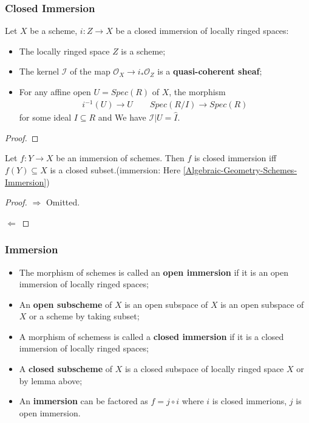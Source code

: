 \documentclass[Total.tex]{subfiles}
\begin{document}
		\subsubsection{Closed Immersion}
		\begin{lemma}
			Let $X$ be a scheme, $i:Z\rightarrow X$ be a closed immersion of locally ringed spaces:
			\begin{itemize}
				\item The locally ringed space $Z$ is a scheme;
				\item The kernel $\mathcal{I}$ of the map $\mathcal{O}_X\rightarrow i_*\mathcal{O}_Z$ is a \textbf{quasi-coherent sheaf};
				\item For any affine open $U=Spec(R)$ of $X$, the morphism
				\begin{gather*}
					i^{-1}(U)\rightarrow U\qquad Spec(R/I)\rightarrow Spec(R)
				\end{gather*}
				for some ideal $I\subseteq R$ and
				We have $\mathcal{I}|U=\hat{I}$.
			\end{itemize}
		\end{lemma}
		\begin{proof}
			
		\end{proof}
		
		\begin{lemma}
			Let $f:Y\rightarrow X$ be an immersion of schemes. Then $f$ is closed immersion iff $f(Y)\subseteq X$ is a closed subset.(immersion: Here \ref{Algebraic-Geometry-Schemes-Immersion})
		\end{lemma}
		\begin{proof}
			$\Rightarrow$ Omitted.
			
			$\Leftarrow$ 
		\end{proof}
		\subsubsection{Immersion}
		\begin{Def}
			\begin{itemize}
				\item The morphism of schemes is called an \textbf{open immersion} if it is an open immersion of locally ringed spaces;
				\item An \textbf{open subscheme} of $X$ is an open subspace of $X$ is an open subspace of $X$ or a scheme by taking subset;
				\item A morphism of schemess is called a \textbf{closed immersion} if it is a closed immersion of locally ringed spaces;
				\item A \textbf{closed subscheme} of $X$ is a closed subspace of locally ringed space $X$ or by lemma above;
				\item An \textbf{immersion} can be factored as $f=j\circ i$ where $i$ is closed immerions, $j$ is open immersion.\label{Algebraic-Geometry-Schemes-Immersion}
			\end{itemize}
		\end{Def}
		
\end{document}
